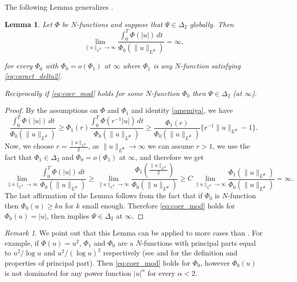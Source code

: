 \documentclass[twoside]{article}
\newtheorem{lem}[thm]{Lemma}
\theoremstyle{remark}
\newtheorem{comentario}{Remark}
\newcommand{\orlnor}{\|_{L^{\Phi}}}
\begin{document}
The following Lemma generalizes \cite[Lemma 5.2]{ABGMS2015}.

\begin{lem}
Let $\Phi$ be $N$-functions and suppose that $\Psi \in \Delta_2$ globally. Then
\begin{equation}\label{eq:coer_mod}
\lim\limits_{\|u\orlnor\to \infty}
\frac{\int_0^T \Phi(|u|)\,dt}{\Phi_0(\|u\orlnor)}=\infty,
\end{equation}


for every $\Phi_0$ with $\Phi_0=o(\Phi_1)$ at $\infty$ where $\Phi_1$ is any $N$-function satisfying \eqref{eq:caract_delta2}.

Reciprocally if  \eqref{eq:coer_mod} holds for some $N$-function $\Phi_0$ then $\Psi\in\Delta_2$ (at $\infty$). 
\end{lem}

\begin{proof}
By the assumptions on $\Phi$ and $\Phi_1$  and identity \eqref{amemiya}, we have
\[
\frac{\int_0^T \Phi(|u|)\,dt}{\Phi_0(\|u\orlnor)}\geq
\Phi_1(r) \frac{\int_0^T \Phi(r^{-1}|u|)\,dt}{\Phi_0(\|u\orlnor)}\geq
\frac{\Phi_1(r)}{\Phi_0(\|u\orlnor)}\{r^{-1}\|u\orlnor-1\}.
\]
Now, we choose $r=\frac{\|u\orlnor}{2}$, as $\|u\orlnor\to\infty$ we can assume $r>1$, we use the fact that $\Phi_1\in\Delta_2$ and
$\Phi_0=o(\Phi_1)$ at $\infty$, and 
therefore we get
\[
\lim\limits_{\|u\orlnor \to \infty} \frac{\int_0^T \Phi(|u|)\,dt}{\Phi_0(\|u\orlnor)}\geq
\lim\limits_{\|u\orlnor \to \infty} \frac{\Phi_1\left(\frac{\|u\orlnor}{2}\right)}{\Phi_0(\|u\orlnor)}
\geq
C \lim\limits_{\|u\orlnor \to \infty} \frac{\Phi_1(\|u\orlnor)}{\Phi_0(\|u\orlnor)}=\infty.
\]
The last affirmation of the Lemma follows from the fact that if $\Phi_0$ is $N$-function then $\Phi_0(u)\geq ku$ for  $k$ small enough. Therefore \eqref{eq:coer_mod} holds for $\Phi_0(u)=|u|$, then \cite[Lemma 5.2]{ABGMS2015}  implies  $\Psi\in\Delta_2$ at $\infty$.

\end{proof}


\begin{comentario}  We point out that this Lemma can be applied to more cases than \cite[Lemma 5.2]{ABGMS2015}. For example, if $\Phi(u)=u^2$, $\Phi_1$ and $\Phi_0$ are a $N$-functions with principal parts equal to $u^2/\log u$ and $u^2/(\log u)^2$ respectively (see \cite[p. 16]{KR} and \cite[Section 7]{KR} for the definition and properties of principal part). Then  \eqref{eq:coer_mod} holds for $\Phi_0$, however $\Phi_0(u)$ is not dominated for any  power function $|u|^{\alpha}$ for every $\alpha<2$. 
\end{comentario}
\end{document}
